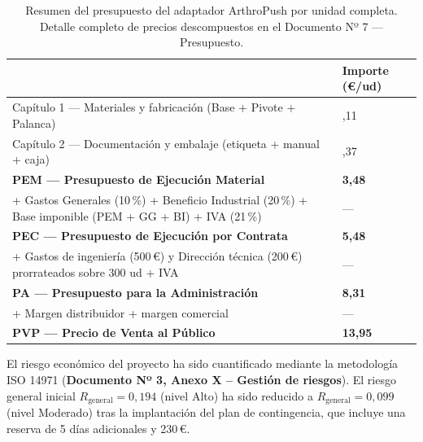 \documentclass[11pt,a4paper]{article}
\begin{document}
\begin{table}[H]
    \centering
    \small
    \renewcommand{\arraystretch}{1.8}
    \begin{tabularx}{0.90\linewidth}{|X|>{\centering\arraybackslash}m{4cm}|}
        \hline
        \rowcolor{ArthroNavy}
        \multicolumn{1}{|c|}{\color{white}\textbf{Nivel presupuestario}} & \color{white}\textbf{Importe (€/ud)} \\ \hline
        Capítulo 1 — Materiales y fabricación (Base + Pivote + Palanca) & 3,11 \\ \hline
        Capítulo 2 — Documentación y embalaje (etiqueta + manual + caja) & 0,37 \\ \hline
        \rowcolor{ArthroTeal!10}
        \textbf{PEM — Presupuesto de Ejecución Material} & \textbf{3,48} \\ \hline
        + Gastos Generales (10\,\%) + Beneficio Industrial (20\,\%) + Base imponible (PEM + GG + BI) + IVA (21\,\%) & — \\ \hline
        \rowcolor{ArthroTeal!15}
        \textbf{PEC — Presupuesto de Ejecución por Contrata} & \textbf{5,48} \\ \hline
        + Gastos de ingeniería (500\,€) y Dirección técnica (200\,€) prorrateados sobre 300 ud + IVA & — \\ \hline
        \rowcolor{ArthroTeal!20}
        \textbf{PA — Presupuesto para la Administración} & \textbf{8,31} \\ \hline
        + Margen distribuidor + margen comercial & — \\ \hline
        \rowcolor{ArthroNavy!12}
        \textbf{PVP — Precio de Venta al Público} & \textbf{13,95} \\ \hline
    \end{tabularx}
    \caption{Resumen del presupuesto del adaptador ArthroPush por unidad completa. Detalle completo de precios descompuestos en el Documento Nº 7 — Presupuesto.}
    \label{tab:presupuesto_resumen}
\end{table}

El riesgo económico del proyecto ha sido cuantificado mediante la metodología ISO 14971 (\textbf{Documento Nº 3, Anexo X -- Gestión de riesgos}). El riesgo general inicial $R_{\text{general}} = 0{,}194$ (nivel Alto) ha sido reducido a $R_{\text{general}} = 0{,}099$ (nivel Moderado) tras la implantación del plan de contingencia, que incluye una reserva de 5 días adicionales y 230\,€.


\end{document}

